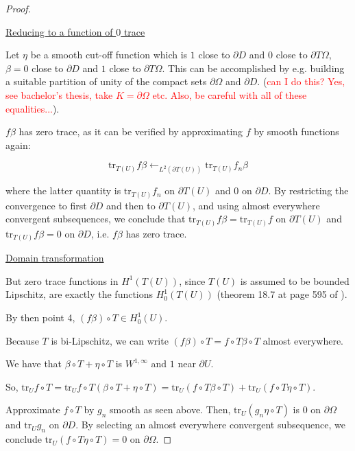 \documentclass[english,a4paper,9pt,oneside]{scrbook}	%
\theoremstyle{break}
\newenvironment{mproof}[1][\proofname]{%
  \begin{proof}[#1]$ $\par\nobreak\ignorespaces
}{%
  \end{proof}
}
\renewcommand*{\proofname}{Proof}
\theoremstyle{remark}
\newcommand{\tr}{\text{tr}}
\begin{document}
\begin{appendices}
\begin{mproof}
\underline{Reducing to a function of $0$ trace}

Let $\eta$ be a smooth cut-off function which is $1$ close to $\partial D$ and $0$ close to $\partial T\Omega$, $\beta=0$ close to $\partial D$ and $1$ close to $\partial T\Omega$. This can be accomplished by e.g. building a suitable partition of unity of the compact sets $\partial \Omega$ and $\partial D$. (\textcolor{red}{can I do this? Yes, see bachelor's thesis, take $K =\partial \Omega$ etc. Also, be careful with all of these equalities...}).


$f\beta$ has zero trace, as it can be verified by approximating $f$ by smooth functions again: 

$$\tr_{T(U)} f\beta \leftarrow_{L^2(\partial T(U))} \tr_{T(U)} f_n \beta $$

where the latter quantity is $\tr_{T(U)} f_n $ on $\partial T(U)$ and $0$ on $\partial D$. By restricting the convergence  to first $\partial D$ and then to $\partial T(U)$, and using almost everywhere convergent subsequences, we conclude that $\tr_{T(U)} f \beta = \tr_{T(U)} f $ on $\partial T(U)$ and  $\tr_{T(U)} f \beta = 0 $ on $\partial D$, i.e.  $f\beta$ has zero trace.

%

\underline{Domain transformation}

But zero trace functions in $H^1(T(U))$, since $T(U)$ is assumed to be bounded Lipschitz, are exactly the functions $H^1_0(T(U))$ (theorem 18.7 at page 595 of \cite{leoni}).

By then point 4, $(f\beta)\circ T \in H^1_0(U)$.

Because $T$ is bi-Lipschitz, we can write $(f\beta)\circ T = f \circ T \beta \circ T$ almost everywhere.

We have that $\beta \circ T +  \eta \circ T$ is $W^{1,\infty}$ and $1$ near $\partial U$. 

So, $\tr_U f\circ T = \tr_U f\circ T(\beta \circ T +  \eta \circ T) = \tr_U (f\circ T\beta \circ T) + \tr_U (f\circ T  \eta \circ T)$.

Approximate $f\circ T$ by $g_n$ smooth as seen above.  Then, $\tr_U (g_n \eta \circ T)$ is $0$ on $\partial \Omega$ and $\tr_U g_n$ on $\partial D$. By selecting an almost everywhere convergent subsequence, we conclude $\tr_U (f\circ T \eta \circ T) = 0$ on $\partial \Omega$. 


\end{mproof}
\end{appendices}
\end{document}
